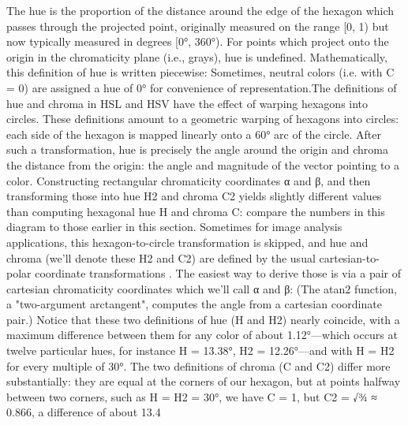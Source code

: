 The hue is the proportion of the distance around the edge of the hexagon which passes through the projected point, originally measured on the range [0, 1) but now typically measured in degrees [0°, 360°). For points which project onto the origin in the chromaticity plane (i.e., grays), hue is undefined. Mathematically, this definition of hue is written piecewise:
Sometimes, neutral colors (i.e. with C = 0) are assigned a hue of 0° for convenience of representation.The definitions of hue and chroma in HSL and HSV have the effect of warping hexagons into circles.
These definitions amount to a geometric warping of hexagons into circles: each side of the hexagon is mapped linearly onto a 60° arc of the circle. After such a transformation, hue is precisely the angle around the origin and chroma the distance from the origin: the angle and magnitude of the vector pointing to a color.
 Constructing rectangular chromaticity coordinates α and β, and then transforming those into hue H2 and chroma C2 yields slightly different values than computing hexagonal hue H and chroma C: compare the numbers in this diagram to those earlier in this section.
Sometimes for image analysis applications, this hexagon-to-circle transformation is skipped, and hue and chroma (we’ll denote these H2 and C2) are defined by the usual cartesian-to-polar coordinate transformations . The easiest way to derive those is via a pair of cartesian chromaticity coordinates which we’ll call α and β:
 (The atan2 function, a "two-argument arctangent", computes the angle from a cartesian coordinate pair.)
 Notice that these two definitions of hue (H and H2) nearly coincide, with a maximum difference between them for any color of about 1.12°—which occurs at twelve particular hues, for instance H = 13.38°, H2 = 12.26°—and with H = H2 for every multiple of 30°. The two definitions of chroma (C and C2) differ more substantially: they are equal at the corners of our hexagon, but at points halfway between two corners, such as H = H2 = 30°, we have C = 1, but C2 = √¾ ≈ 0.866, a difference of about 13.4%
 
